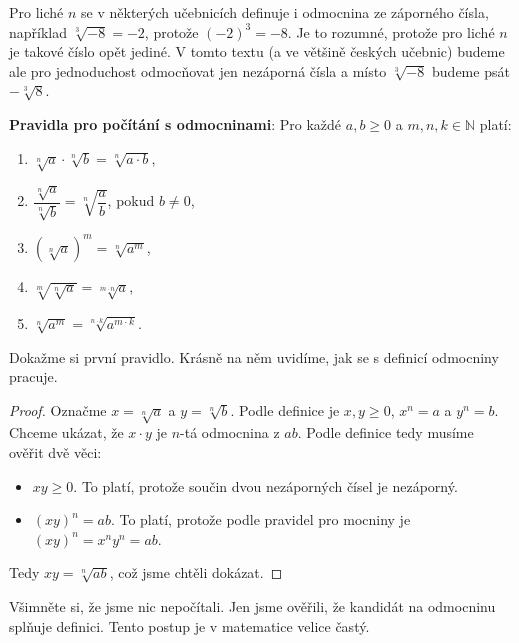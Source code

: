 \begin{note}
  Pro liché $n$ se v některých učebnicích definuje i odmocnina ze záporného čísla, například $\sqrt[3]{-8} = -2$, protože ${(-2)}^3 = -8$. Je to rozumné, protože pro liché $n$ je takové číslo opět jediné. V tomto textu (a ve většině českých učebnic) budeme ale pro jednoduchost odmocňovat jen nezáporná čísla a místo $\sqrt[3]{-8}$ budeme psát $-\sqrt[3]{8}$.
\end{note}

\begin{definitionbox}
  \textbf{Pravidla pro počítání s odmocninami}: Pro každé $a, b\geq 0$ a $m, n, k\in\mathbb{N}$ platí:
  \begin{enumerate}
    \item $\sqrt[n]{a}\cdot\sqrt[n]{b} = \sqrt[n]{a\cdot b}$,
    \item $\dfrac{\sqrt[n]{a}}{\sqrt[n]{b}} = \sqrt[n]{\dfrac{a}{b}}$, pokud $b\neq 0$,
    \item ${\left(\sqrt[n]{a}\right)}^m = \sqrt[n]{a^m}$,
    \item $\sqrt[m]{\sqrt[n]{a}} = \sqrt[m\cdot n]{a}$,
    \item $\sqrt[n]{a^m} = \sqrt[n\cdot k]{a^{m\cdot k}}$.
  \end{enumerate}
\end{definitionbox}

\begin{example}\label{ex:odmocniny-soucin}
  Dokažme si první pravidlo. Krásně na něm uvidíme, jak se s definicí odmocniny pracuje.

  \begin{proof}
    Označme $x = \sqrt[n]{a}$ a $y = \sqrt[n]{b}$. Podle definice je $x, y\geq 0$, $x^n = a$ a $y^n = b$. Chceme ukázat, že $x\cdot y$ je $n$-tá odmocnina z $ab$. Podle definice tedy musíme ověřit dvě věci:
    \begin{itemize}
      \item $xy \geq 0$. To platí, protože součin dvou nezáporných čísel je nezáporný.
      \item ${(xy)}^n = ab$. To platí, protože podle pravidel pro mocniny je ${(xy)}^n = x^ny^n = ab$.
    \end{itemize}
    Tedy $xy = \sqrt[n]{ab}$, což jsme chtěli dokázat.
  \end{proof}

  Všimněte si, že jsme nic nepočítali. Jen jsme ověřili, že kandidát na odmocninu splňuje definici. Tento postup je v matematice velice častý.
\end{example}

